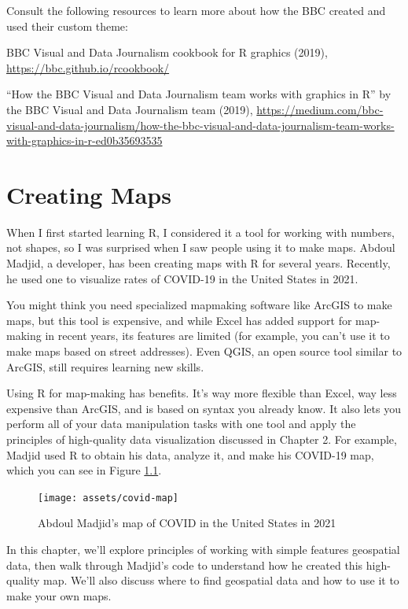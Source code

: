 \documentclass[
]{book}
\begin{document}
Consult the following resources to learn more about how the BBC created and used their custom theme:

BBC Visual and Data Journalism cookbook for R graphics (2019), \url{https://bbc.github.io/rcookbook/}

``How the BBC Visual and Data Journalism team works with graphics in R'' by the BBC Visual and Data Journalism team (2019), \url{https://medium.com/bbc-visual-and-data-journalism/how-the-bbc-visual-and-data-journalism-team-works-with-graphics-in-r-ed0b35693535}

\hypertarget{maps-chapter}{%
\chapter{Creating Maps}\label{maps-chapter}}

When I first started learning R, I considered it a tool for working with numbers, not shapes, so I was surprised when I saw people using it to make maps. Abdoul Madjid, a developer, has been creating maps with R for several years. Recently, he used one to visualize rates of COVID-19 in the United States in 2021.

You might think you need specialized mapmaking software like ArcGIS to make maps, but this tool is expensive, and while Excel has added support for map-making in recent years, its features are limited (for example, you can't use it to make maps based on street addresses). Even QGIS, an open source tool similar to ArcGIS, still requires learning new skills.

Using R for map-making has benefits. It's way more flexible than Excel, way less expensive than ArcGIS, and is based on syntax you already know. It also lets you perform all of your data manipulation tasks with one tool and apply the principles of high-quality data visualization discussed in Chapter 2. For example, Madjid used R to obtain his data, analyze it, and make his COVID-19 map, which you can see in Figure \ref{fig:madjid-covid-map}.

\begin{figure}
\texttt{[image: assets/covid-map]} \caption{Abdoul Madjid's map of COVID in the United States in 2021}\label{fig:madjid-covid-map}
\end{figure}

In this chapter, we'll explore principles of working with simple features geospatial data, then walk through Madjid's code to understand how he created this high-quality map. We'll also discuss where to find geospatial data and how to use it to make your own maps.
\end{document}
